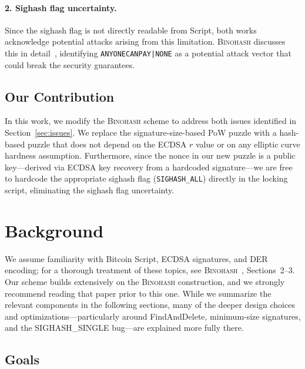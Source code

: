 \documentclass[11pt, a4paper]{article}
\begin{document}
\paragraph{2. Sighash flag uncertainty.}
Since the sighash flag is not directly readable from Script, both works acknowledge potential attacks arising from this limitation. \textsc{Binohash} discusses this in detail~\cite[Section~7.1]{linus2024binohash}, identifying \texttt{ANYONECANPAY|NONE} as a potential attack vector that could break the security guarantees.

\subsection{Our Contribution}
\label{sec:contribution}

In this work, we modify the \textsc{Binohash} scheme to address both issues identified in Section~\ref{sec:issues}. We replace the signature-size-based PoW puzzle with a hash-based puzzle that does not depend on the ECDSA $r$ value or on any elliptic curve hardness assumption. Furthermore, since the nonce in our new puzzle is a public key---derived via ECDSA key recovery from a hardcoded signature---we are free to hardcode the appropriate sighash flag (\texttt{SIGHASH\_ALL}) directly in the locking script, eliminating the sighash flag uncertainty.

\section{Background}
\label{sec:background}

We assume familiarity with Bitcoin Script, ECDSA signatures, and DER encoding; for a thorough treatment of these topics, see \textsc{Binohash}~\cite{linus2024binohash}, Sections~2--3. Our scheme builds extensively on the \textsc{Binohash} construction, and we strongly recommend reading that paper prior to this one. While we summarize the relevant components in the following sections, many of the deeper design choices and optimizations---particularly around FindAndDelete, minimum-size signatures, and the SIGHASH\_SINGLE bug---are explained more fully there.

\subsection{Goals}
\label{sec:goals}
\end{document}
